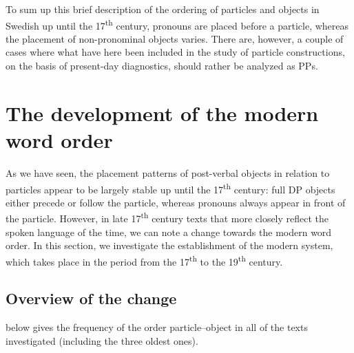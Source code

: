 \documentclass[output=paper]{langscibook}
\begin{document}
To sum up this brief description of the ordering of particles and objects in Swedish up until the 17\textsuperscript{th} century, pronouns are placed before a particle, whereas the placement of non-pronominal objects varies. There are, however, a couple of cases where what have here been included in the study of particle constructions, on the basis of present-day diagnostics, should rather be analyzed as PPs. 


\section{The development of the modern word order}\label{sec:lalu:5}


As we have seen, the placement patterns of post-verbal objects in relation to particles appear to be largely stable up until the 17\textsuperscript{th} century: full DP objects either precede or follow the particle, whereas pronouns always appear in front of the particle. However, in late 17\textsuperscript{th} century texts that more closely reflect the spoken language of the time, we can note a change towards the modern word order. In this section, we investigate the establishment of the modern system, which takes place in the period from the 17\textsuperscript{th} to the 19\textsuperscript{th} century.


\subsection{Overview of the change}\label{sec:lalu:5.1}

 below gives the frequency of the order particle–object in all of the texts investigated (including the three oldest ones).
\end{document}
